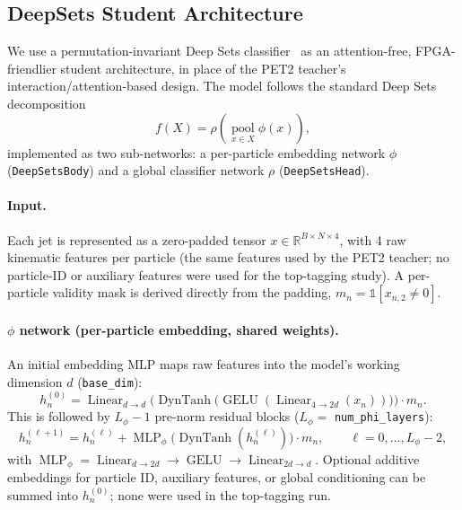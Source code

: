 \subsection{DeepSets Student Architecture}
\label{sec:deepsets-arch}

We use a permutation-invariant Deep Sets classifier~\cite{zaheer2017deepsets} as an
attention-free, FPGA-friendlier student architecture, in place of the PET2 teacher's
interaction/attention-based design. The model follows the standard Deep Sets
decomposition
\begin{equation}
    f(X) = \rho\!\left( \operatorname*{pool}_{x \in X} \phi(x) \right),
\end{equation}
implemented as two sub-networks: a per-particle embedding network $\phi$
(\texttt{DeepSetsBody}) and a global classifier network $\rho$
(\texttt{DeepSetsHead}).

\paragraph{Input.}
Each jet is represented as a zero-padded tensor $x \in \mathbb{R}^{B \times N \times 4}$,
with 4 raw kinematic features per particle (the same features used by the PET2
teacher; no particle-ID or auxiliary features were used for the top-tagging study).
A per-particle validity mask is derived directly from the padding,
$m_n = \mathbb{1}[x_{n,2} \neq 0]$.

\paragraph{$\phi$ network (per-particle embedding, shared weights).}
An initial embedding MLP maps raw features into the model's working dimension
$d$ (\texttt{base\_dim}):
\begin{equation}
    h_n^{(0)} = \operatorname{Linear}_{d \to d}\!\Big(
        \operatorname{DynTanh}\!\big(
            \operatorname{GELU}(\operatorname{Linear}_{4 \to 2d}(x_n))
        \big)
    \Big) \cdot m_n .
\end{equation}
This is followed by $L_\phi - 1$ pre-norm residual blocks ($L_\phi = $
\texttt{num\_phi\_layers}):
\begin{equation}
    h_n^{(\ell+1)} = h_n^{(\ell)} + \operatorname{MLP}_\phi\!\big(
        \operatorname{DynTanh}(h_n^{(\ell)})
    \big) \cdot m_n, \qquad \ell = 0, \dots, L_\phi - 2,
\end{equation}
with $\operatorname{MLP}_\phi = \operatorname{Linear}_{d \to 2d} \to
\operatorname{GELU} \to \operatorname{Linear}_{2d \to d}$. Optional additive
embeddings for particle ID, auxiliary features, or global conditioning can be
summed into $h_n^{(0)}$; none were used in the top-tagging run.

